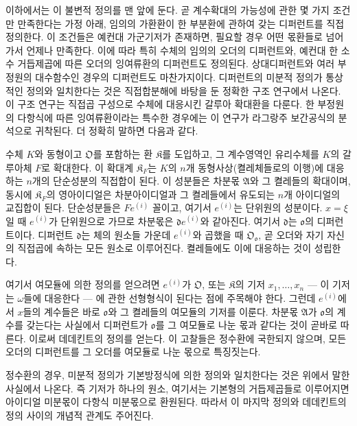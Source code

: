 이하에서는 이 불변적 정의를 맨 앞에 둔다. 곧 계수확대의 가능성에 관한 몇 가지 조건만 만족한다는 가정 아래, 임의의 가환환이 한 부분환에 관하여 갖는 디퍼런트를 직접 정의한다. 이 조건들은 예컨대 가군기저가 존재하면, 필요할 경우 어떤 몫환들로 넘어가서 언제나 만족한다. 이에 따라 특히 수체의 임의의 오더의 디퍼런트와, 예컨대 한 소수 거듭제곱에 따른 오더의 잉여류환의 디퍼런트도 정의된다. 상대디퍼런트와 여러 부정원의 대수함수인 경우의 디퍼런트도 마찬가지이다. 디퍼런트의 미분적 정의가 통상적인 정의와 일치한다는 것은 직접합분해에 바탕을 둔 정확한 구조 연구에서 나온다. 이 구조 연구는 직접곱 구성으로 수체에 대응시킨 갈루아 확대환을 다룬다. 한 부정원의 다항식에 따른 잉여류환이라는 특수한 경우에는 이 연구가 라그랑주 보간공식의 분석으로 귀착된다. 더 정확히 말하면 다음과 같다.

수체 \(K\)와 동형이고 \(\mathfrak O\)를 포함하는 환 \(\mathfrak K\)를 도입하고, 그 계수영역인 유리수체를 \(K\)의 갈루아체 \(F\)로 확대한다. 이 확대계 \(\mathfrak K_F\)는 \(K\)의 \(n\)개 동형사상(켤레체들로의 이행)에 대응하는 \(n\)개의 단순성분의 직접합이 된다. 이 성분들은 차분몫 \(\mathfrak A\)와 그 켤레들의 확대이며, 동시에 \(\mathfrak K_F\)의 영아이디얼은 차분아이디얼과 그 켤레들에서 유도되는 \(n\)개 아이디얼의 교집합이 된다. 단순성분들은 \(Fe^{(i)}\) 꼴이고, 여기서 \(e^{(i)}\)는 단위원의 성분이다. \(x=\xi\)일 때 \(e^{(i)}\)가 단위원으로 가므로 차분몫은 \(\mathfrak d e^{(i)}\)와 같아진다. 여기서 \(\mathfrak d\)는 \(\mathfrak o\)의 디퍼런트이다. 디퍼런트 \(\mathfrak d\)는 체의 원소들 가운데 \(e^{(i)}\)와 곱했을 때 \(\mathfrak O_{\mathfrak o}\), 곧 오더와 자기 자신의 직접곱에 속하는 모든 원소로 이루어진다. 켤레들에도 이에 대응하는 것이 성립한다.

여기서 여모듈에 의한 정의를 얻으려면 \(e^{(i)}\)가 \(\mathfrak O\), 또는 \(\mathfrak K\)의 기저 \(x_1,\ldots,x_n\) --- 이 기저는 \(\omega\)들에 대응한다 --- 에 관한 선형형식이 된다는 점에 주목해야 한다. 그런데 \(e^{(i)}\)에서 \(x\)들의 계수들은 바로 \(\mathfrak o\)와 그 켤레들의 여모듈의 기저를 이룬다. 차분몫 \(\mathfrak A\)가 \(\mathfrak o\)의 계수를 갖는다는 사실에서 디퍼런트가 \(\mathfrak o\)를 그 여모듈로 나눈 몫과 같다는 것이 곧바로 따른다. 이로써 데데킨트의 정의를 얻는다. 이 고찰들은 정수환에 국한되지 않으며, 모든 오더의 디퍼런트를 그 오더를 여모듈로 나눈 몫으로 특징짓는다.

정수환의 경우, 미분적 정의가 기본방정식에 의한 정의와 일치한다는 것은 위에서 말한 사실에서 나온다. 즉 기저가 하나의 원소, 여기서는 기본형의 거듭제곱들로 이루어지면 아이디얼 미분몫이 다항식 미분몫으로 환원된다. 따라서 이 마지막 정의와 데데킨트의 정의 사이의 개념적 관계도 주어진다.

